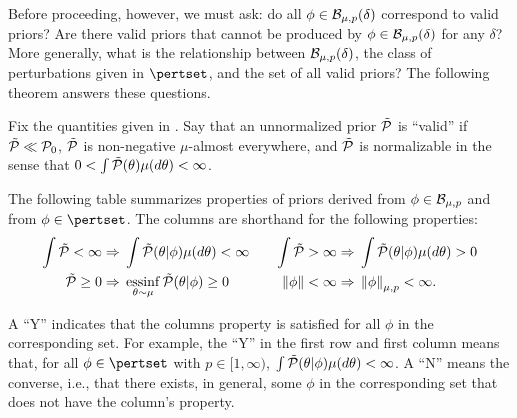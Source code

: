 Before proceeding, however, we must ask: do all $\phi \in \mathcal{B}_{\mu,p}(\delta)$
correspond to valid priors?  Are there valid priors that cannot be produced by
$\phi \in \mathcal{B}_{\mu,p}(\delta)$ for any $\delta$?  More generally, what is the
relationship between $\mathcal{B}_{\mu,p}(\delta)$, the class of perturbations given
in $\pertset$, and the set of all valid priors?  The following theorem answers
these questions.


\begin{thm}
%
Fix the quantities given in .  Say that an unnormalized
prior $\tilde{\mathcal{P}}$ is ``valid'' if $\tilde{\mathcal{P}} \ll \mathcal{P}_{0}$, $\tilde{\mathcal{P}}$ is non-negative
$\mu$-almost everywhere, and $\tilde{\mathcal{P}}$ is normalizable in the sense that $0 < \int
\tilde{\mathcal{P}}(\theta) \mu(d\theta) < \infty$.

The following table summarizes properties of priors derived from
$\phi \in \mathcal{B}_{\mu,p}$ and from $\phi \in \pertset$.  The columns are
shorthand for the following properties:
%
\begin{align*}
%
\int \ptil < \infty \Rightarrow{}&
    \int \ptil(\theta \vert \phi) \mu(d\theta) < \infty   &\quad
%
\int \ptil > \infty \Rightarrow{}&
    \int \ptil(\theta \vert \phi) \mu(d\theta) > 0\\
%
\ptil \ge 0 \Rightarrow{}&
    \essinf_{\theta \sim \mu} \ptil(\theta \vert \phi) \ge 0  &\quad
\norm{\phi} < \infty \Rightarrow{}& \norm{\phi}_{\mu,p} < \infty.
%
\end{align*}

A ``Y'' indicates that the columns property is satisfied for all $\phi$ in the
corresponding set.  For example, the ``Y'' in the first row and first column
means that, for all $\phi \in \pertset$ with $p \in [1, \infty)$, $\int
\tilde{\mathcal{P}}(\theta \vert \phi) \mu(d\theta) < \infty$.  A ``N'' means the converse,
i.e., that there exists, in general, some $\phi$ in the corresponding set that
does not have the column's property.


\end{thm}
